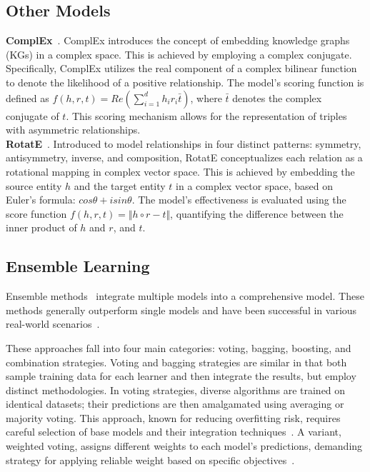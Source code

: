 \documentclass{article}
\begin{document}
\subsection{Other Models}
\textbf{ComplEx}~\cite{trouillon2016complex}. ComplEx introduces the concept of embedding knowledge graphs (KGs) in a complex space. This is achieved by employing a complex conjugate. Specifically, ComplEx utilizes the real component of a complex bilinear function to denote the likelihood of a positive relationship. The model's scoring function is defined as $f(h, r, t)=Re(\sum_{i=1}^dh_ir_i\bar{t})$, where $\bar{t}$ denotes the complex conjugate of $t$. This scoring mechanism allows for the representation of triples with asymmetric relationships.\\
\textbf{RotatE}~\cite{sun2019rotate}. Introduced to model relationships in four distinct patterns: symmetry, antisymmetry, inverse, and composition, RotatE conceptualizes each relation as a rotational mapping in complex vector space. This is achieved by embedding the source entity $h$ and the target entity $t$ in a complex vector space, based on Euler's formula: $cos\theta + i sin\theta$. The model's effectiveness is evaluated using the score function $f(h,r,t) = \Vert h \circ r - t \Vert$, quantifying the difference between the inner product of $h$ and $r$, and $t$.

\subsection{Ensemble Learning}
Ensemble methods~\cite{zhou2012ensemble} integrate multiple models into a comprehensive model. These methods generally outperform single models and have been successful in various real-world scenarios~\cite{rivas2022ensembles,osamor2021enhancing}. 

These approaches fall into four main categories: voting, bagging, boosting, and combination strategies. Voting and bagging strategies  are similar in that both sample training data for each learner and then integrate the results, but employ distinct methodologies. In voting strategies, diverse algorithms are trained on identical datasets; their predictions are then amalgamated using averaging or majority voting. This approach, known for reducing overfitting risk, requires careful selection of base models and their integration techniques~\cite{a13010026}. A variant, weighted voting, assigns different weights to each model's predictions, demanding strategy for applying reliable weight based on specific objectives~\cite{osamor2021enhancing}.
\end{document}
